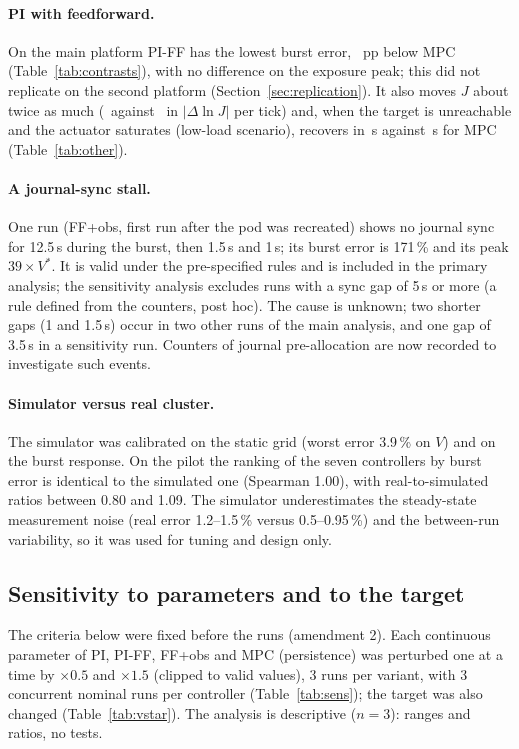 \documentclass[smallextended]{svjour3}
\begin{document}
\paragraph{PI with feedforward.}
On the main platform PI-FF has the lowest burst error, \cAMaePIFFMPCPS\ pp below MPC (Table~\ref{tab:contrasts}), with no difference on the exposure peak; this did not replicate on the second platform (Section~\ref{sec:replication}). It also moves $J$ about twice as much
(\ChatPIFFS\ against \ChatMPCPS\ in $|\Delta\ln J|$ per tick) and, when the target is unreachable and the actuator saturates (low-load scenario), recovers in \LowRecPIFFS\,s against \LowRecMPCPS\,s
for MPC (Table~\ref{tab:other}).


\paragraph{A journal-sync stall.}
One run (FF+obs, first run after the pod was recreated) shows no journal sync for 12.5\,s during the burst, then 1.5\,s and 1\,s; its burst error is 171\,\% and its peak $39\times V^*$. It is valid under the
pre-specified rules and is included in the primary analysis; the sensitivity analysis excludes runs with a sync gap of 5\,s or more (a rule defined from the counters, post hoc). The cause is unknown; two shorter gaps (1 and 1.5\,s) occur in two other runs of the main analysis, and one gap of 3.5\,s in a sensitivity run. Counters of journal pre-allocation are now recorded to investigate such events.

\paragraph{Simulator versus real cluster.}
The simulator was calibrated on the static grid (worst error 3.9\,\% on $V$) and on the burst response. On the pilot the ranking of the seven controllers by burst error is identical to the simulated
one (Spearman 1.00), with real-to-simulated ratios between 0.80 and 1.09. The simulator underestimates the steady-state measurement noise (real error 1.2--1.5\,\% versus 0.5--0.95\,\%) and the between-run variability,
so it was used for tuning and design only.

\subsection{Sensitivity to parameters and to the target}
The criteria below were fixed before the runs (amendment 2). Each continuous parameter of PI, PI-FF, FF+obs and MPC (persistence) was perturbed one at a time by $\times0.5$ and $\times1.5$ (clipped to valid values), 3 runs per variant, with 3 concurrent nominal runs per controller
(Table~\ref{tab:sens}); the target was also changed (Table~\ref{tab:vstar}). The analysis is descriptive ($n=3$): ranges and ratios, no tests.
\end{document}
